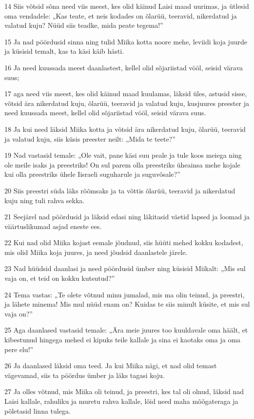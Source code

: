 \par 14 Siis võtsid sõna need viis meest, kes olid käinud Laisi maad uurimas, ja ütlesid oma vendadele: „Kas teate, et neis kodades on õlarüü, teeravid, nikerdatud ja valatud kuju? Nüüd siis teadke, mida peate tegema!”
\par 15 Ja nad pöördusid sinna ning tulid Miika kotta noore mehe, leviidi koja juurde ja küsisid temalt, kas ta käsi käib hästi.
\par 16 Ja need kuussada meest daanlastest, kellel olid sõjariistad vööl, seisid värava suus;
\par 17 aga need viis meest, kes olid käinud maad kuulamas, läksid üles, astusid sisse, võtsid ära nikerdatud kuju, õlarüü, teeravid ja valatud kuju, kusjuures preester ja need kuussada meest, kellel olid sõjariistad vööl, seisid värava suus.
\par 18 Ja kui need läksid Miika kotta ja võtsid ära nikerdatud kuju, õlarüü, teeravid ja valatud kuju, siis küsis preester neilt: „Mida te teete?”
\par 19 Nad vastasid temale: „Ole vait, pane käsi suu peale ja tule koos meiega ning ole meile isaks ja preestriks! On sul parem olla preestriks üheainsa mehe kojale kui olla preestriks ühele Iisraeli suguharule ja suguvõsale?”
\par 20 Siis preestri süda läks rõõmsaks ja ta võttis õlarüü, teeravid ja nikerdatud kuju ning tuli rahva sekka.
\par 21 Seejärel nad pöördusid ja läksid edasi ning läkitasid väetid lapsed ja loomad ja väärtuslikumad asjad eneste ees.
\par 22 Kui nad olid Miika kojast eemale jõudnud, siis hüüti mehed kokku kodadest, mis olid Miika koja juures, ja need jõudsid daanlastele järele.
\par 23 Nad hüüdsid daanlasi ja need pöördusid ümber ning küsisid Miikalt: „Mis sul vaja on, et teid on kokku kutsutud?”
\par 24 Tema vastas: „Te olete võtnud minu jumalad, mis ma olin teinud, ja preestri, ja lähete minema! Mis mul nüüd enam on? Kuidas te siis minult küsite, et mis sul vaja on?”
\par 25 Aga daanlased vastasid temale: „Ära meie juures too kuuldavale oma häält, et kibestunud hingega mehed ei kipuks teile kallale ja sina ei kaotaks oma ja oma pere elu!”
\par 26 Ja daanlased läksid oma teed. Ja kui Miika nägi, et nad olid temast vägevamad, siis ta pöördus ümber ja läks tagasi koju.
\par 27 Ja olles võtnud, mis Miika oli teinud, ja preestri, kes tal oli olnud, läksid nad Laisi kallale, rahuliku ja muretu rahva kallale, lõid need maha mõõgateraga ja põletasid linna tulega.
